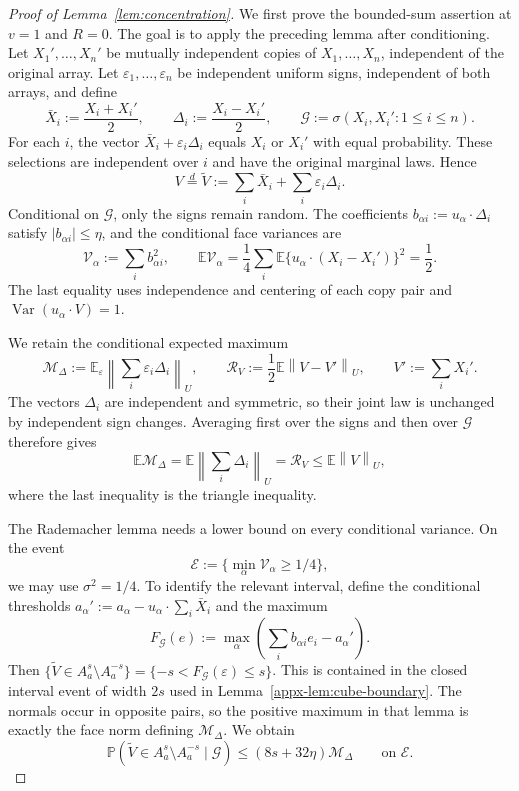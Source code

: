 \documentclass[11pt,letterpaper]{article}
\theoremstyle{remark}
\newcommand{\E}{\mathbb E}
\newcommand{\Pp}{\mathbb P}
\newcommand{\Var}{\operatorname{Var}}
\newcommand{\norm}[1]{\left\lVert#1\right\rVert}
\begin{document}
\begin{proof}[Proof of Lemma~\ref{lem:concentration}]
We first prove the bounded-sum assertion at $v=1$ and $R=0$.
The goal is to apply the preceding lemma after conditioning.
Let $X_1',\ldots,X_n'$ be mutually independent copies of
$X_1,\ldots,X_n$, independent of the original array. Let
$\varepsilon_1,\ldots,\varepsilon_n$ be independent uniform signs,
independent of both arrays, and define
\[
 \bar X_i:=\frac{X_i+X_i'}2,\qquad
 \Delta_i:=\frac{X_i-X_i'}2,\qquad
 \mathcal G:=\sigma(X_i,X_i':1\le i\le n).
\]
For each $i$, the vector $\bar X_i+\varepsilon_i\Delta_i$ equals
$X_i$ or $X_i'$ with equal probability. These selections are
independent over $i$ and have the original marginal laws. Hence
\begin{equation}
 V\stackrel d=\widetilde V:=\sum_i\bar X_i+\sum_i\varepsilon_i\Delta_i.
 \label{appx-eq:pair-representation}
\end{equation}
Conditional on $\mathcal G$, only the signs remain random.
The coefficients $b_{\alpha i}:=u_\alpha\cdot\Delta_i$ satisfy
$|b_{\alpha i}|\le\eta$, and the conditional face variances are
\[
 \mathcal V_\alpha:=\sum_i b_{\alpha i}^2,\qquad
 \E\mathcal V_\alpha
 =\frac14\sum_i\E\{u_\alpha\cdot(X_i-X_i')\}^2
 =\frac12.
\]
The last equality uses independence and centering of each copy pair
and $\Var(u_\alpha\cdot V)=1$.

We retain the conditional expected maximum
\[
 \mathcal M_\Delta:=\E_\varepsilon
       \norm{\sum_i\varepsilon_i\Delta_i}_U,
 \qquad
 \mathcal R_V:=\frac12\E\norm{V-V'}_U,\qquad V':=\sum_iX_i'.
\]
The vectors $\Delta_i$ are independent and symmetric, so their
joint law is unchanged by independent sign changes. Averaging first
over the signs and then over $\mathcal G$ therefore gives
\[
 \E\mathcal M_\Delta
 =\E\norm{\sum_i\Delta_i}_U=\mathcal R_V
 \le\E\norm V_U,
\]
where the last inequality is the triangle inequality.

The Rademacher lemma needs a lower bound on every conditional
variance. On the event
\[
 \mathcal E:=\{\min_\alpha\mathcal V_\alpha\ge1/4\},
\]
we may use $\sigma^2=1/4$. To identify the relevant interval,
define the conditional thresholds
$a_\alpha':=a_\alpha-u_\alpha\cdot\sum_i\bar X_i$ and the maximum
\[
 F_{\mathcal G}(e):=
       \max_\alpha\left(\sum_i b_{\alpha i}e_i-a_\alpha'\right).
\]
Then
$\{\widetilde V\in A_a^s\setminus A_a^{-s}\}
=\{-s<F_{\mathcal G}(\varepsilon)\le s\}$.
This is contained in the closed interval event of width $2s$
used in Lemma~\ref{appx-lem:cube-boundary}.
The normals occur in opposite pairs, so the positive maximum in
that lemma is exactly the face norm defining $\mathcal M_\Delta$.
We obtain
\begin{equation}
 \Pp(\widetilde V\in A_a^s\setminus A_a^{-s}\mid\mathcal G)
 \le(8s+32\eta)\mathcal M_\Delta
 \qquad\text{on }\mathcal E.
 \label{appx-eq:conditional-intrinsic-concentration}
\end{equation}


\end{proof}
\end{document}

